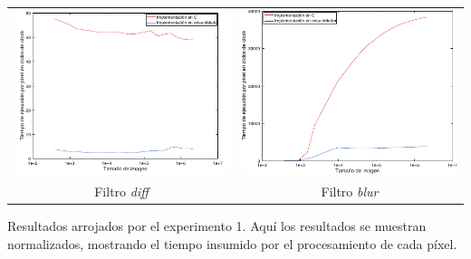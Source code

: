             \noindent{} \begin{minipage}{\textwidth}
                \begin{center}
                    \vspace{1em}
                    \begin{tabular}{cc}
                        \includegraphics{graficos/exp1-diff-tiempo_por_pixel.pdf} & \includegraphics{graficos/exp1-blur-tiempo_por_pixel.pdf} \\
                        {\small Filtro \emph{diff}}                               & {\small Filtro \emph{blur}}
                        \vspace{1em}
                    \end{tabular}
                    Resultados arrojados por el experimento 1. Aquí los resultados se muestran normalizados, mostrando el tiempo insumido por el procesamiento de cada píxel.
                \end{center}
            \end{minipage}

